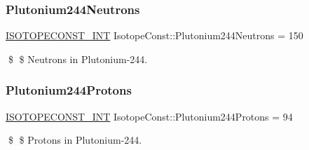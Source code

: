 \subsubsection{\texorpdfstring{Plutonium244\+Neutrons}{Plutonium244Neutrons}}
{\footnotesize\ttfamily \mbox{\hyperlink{group___isotope_const-_macros_ga5f18360b3e99483a35c32d789e62621c}{I\+S\+O\+T\+O\+P\+E\+C\+O\+N\+S\+T\+\_\+\+I\+NT}} Isotope\+Const\+::\+Plutonium244\+Neutrons = 150}

\$ \$ Neutrons in Plutonium-\/244. \mbox{\label{group___isotope_const-_plutonium-_pu244_ga9787c2aa640a2328cdd90795dabf9a7a}} 
\subsubsection{\texorpdfstring{Plutonium244\+Protons}{Plutonium244Protons}}
{\footnotesize\ttfamily \mbox{\hyperlink{group___isotope_const-_macros_ga5f18360b3e99483a35c32d789e62621c}{I\+S\+O\+T\+O\+P\+E\+C\+O\+N\+S\+T\+\_\+\+I\+NT}} Isotope\+Const\+::\+Plutonium244\+Protons = 94}

\$ \$ Protons in Plutonium-\/244. 